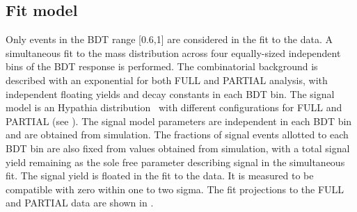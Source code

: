 
\subsection{Fit model}
\label{subsec:fit}
Only events in the BDT range [0.6,1] are considered in the fit to the data.
A simultaneous fit to the mass distribution across four equally-sized
independent bins of the BDT response is performed. The combinatorial background is described
with an exponential \pdf for both FULL and PARTIAL analysis, with independent floating yields and
decay constants in each BDT bin. The signal
model is an Hypathia distribution~\cite{Ipatia} with different configurations
for FULL and PARTIAL (see ). The signal model parameters are independent
in each BDT bin and are obtained from simulation. The fractions of signal events allotted to each
BDT bin are also fixed from values obtained from simulation, with a total signal yield remaining as the sole free parameter describing signal in the simultaneous fit. %
The signal yield is floated in the fit to the data. It is measured to be 
compatible with zero within one to two sigma. %
The fit projections to the FULL and PARTIAL data are shown in .%
